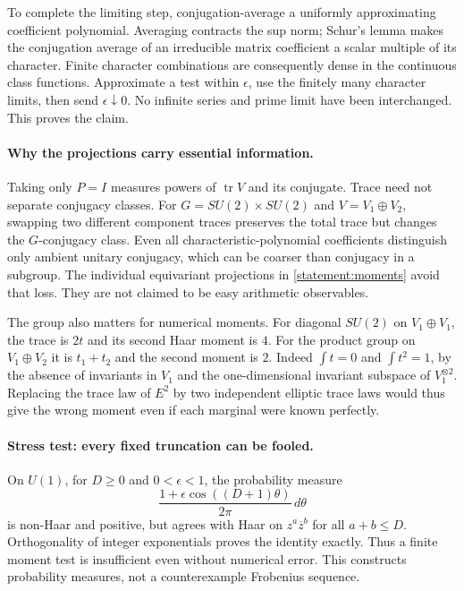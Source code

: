 \documentclass[11pt,a4paper]{article}
\numberwithin{equation}{section}
\begin{document}
To complete the limiting step, conjugation-average a uniformly approximating
coefficient polynomial. Averaging contracts the sup norm; Schur's lemma
makes the conjugation average of an irreducible matrix coefficient a scalar
multiple of its character. Finite character combinations are consequently
dense in the continuous class functions. Approximate a test within
$\epsilon$, use the finitely many character limits, then send
$\epsilon\downarrow0$. No infinite series and prime limit have been
interchanged. This proves the claim.

\paragraph{Why the projections carry essential information.}
Taking only $P=I$ measures powers of $\operatorname{tr}V$ and its conjugate.
Trace need not separate conjugacy classes. For
$G=SU(2)\times SU(2)$ and $V=V_1\oplus V_2$, swapping two different component
traces preserves the total trace but changes the $G$-conjugacy class.
Even all characteristic-polynomial coefficients distinguish only ambient
unitary conjugacy, which can be coarser than conjugacy in a subgroup.
The individual equivariant projections in \eqref{statement:moments} avoid that
loss. They are not claimed to be easy arithmetic observables.

The group also matters for numerical moments. For diagonal $SU(2)$ on
$V_1\oplus V_1$, the trace is $2t$ and its second Haar moment is $4$.
For the product group on $V_1\oplus V_2$ it is $t_1+t_2$ and the second
moment is $2$. Indeed $\int t=0$ and $\int t^2=1$, by the absence of
invariants in $V_1$ and the one-dimensional invariant subspace of
$V_1^{\otimes2}$. Replacing the trace law of $E^2$ by two independent
elliptic trace laws would thus give the wrong moment even if each marginal
were known perfectly.

\paragraph{Stress test: every fixed truncation can be fooled.}
On $U(1)$, for $D\ge0$ and $0<\epsilon<1$, the probability measure
\[
 \frac{1+\epsilon\cos((D+1)\theta)}{2\pi}\,d\theta
\]
is non-Haar and positive, but agrees with Haar on
$z^a\overline z^b$ for all $a+b\le D$. Orthogonality of integer
exponentials proves the identity exactly. Thus a finite moment test is
insufficient even without numerical error. This constructs probability
measures, not a counterexample Frobenius sequence.
\end{document}
